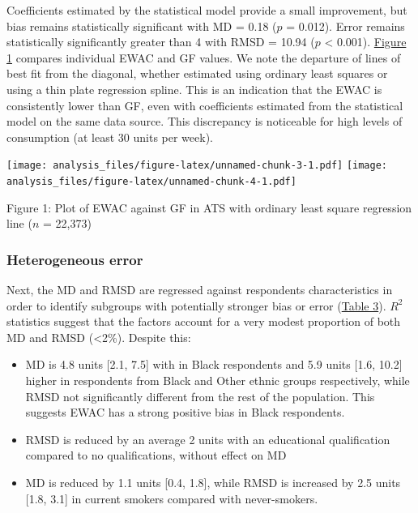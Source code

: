 \documentclass[]{article}
\providecommand{\tightlist}{%
  \setlength{\itemsep}{0pt}\setlength{\parskip}{0pt}}
\begin{document}
Coefficients estimated by the statistical model provide a small
improvement, but bias remains statistically significant with MD = 0.18
(\(p\) = 0.012). Error remains statistically significantly greater than
4 with RMSD = 10.94 (\(p\) \textless{} 0.001).
\protect\hyperlink{figure1}{Figure 1} compares individual EWAC and GF
values. We note the departure of lines of best fit from the diagonal,
whether estimated using ordinary least squares or using a thin plate
regression spline. This is an indication that the EWAC is consistently
lower than GF, even with coefficients estimated from the statistical
model on the same data source. This discrepancy is noticeable for high
levels of consumption (at least 30 units per week).


\texttt{[image: analysis\_files/figure-latex/unnamed-chunk-3-1.pdf]} 
\texttt{[image: analysis\_files/figure-latex/unnamed-chunk-4-1.pdf]}

Figure 1: Plot of EWAC against GF in ATS with ordinary least square
regression line (\(n\) = 22,373)

\hypertarget{heterogeneous-error}{%
\subsubsection{Heterogeneous error}\label{heterogeneous-error}}

Next, the MD and RMSD are regressed against respondents characteristics
in order to identify subgroups with potentially stronger bias or error
(\protect\hyperlink{tab_ewac_validity_reg}{Table 3}). \(R^2\) statistics
suggest that the factors account for a very modest proportion of both MD
and RMSD (\textless{}2\%). Despite this:

\begin{itemize}
\tightlist
\item
  MD is 4.8 units {[}2.1, 7.5{]} with in Black respondents and 5.9 units
  {[}1.6, 10.2{]} higher in respondents from Black and Other ethnic
  groups respectively, while RMSD not significantly different from the
  rest of the population. This suggests EWAC has a strong positive bias
  in Black respondents.
\item
  RMSD is reduced by an average 2 units with an educational
  qualification compared to no qualifications, without effect on MD
\item
  MD is reduced by 1.1 units {[}0.4, 1.8{]}, while RMSD is increased by
  2.5 units {[}1.8, 3.1{]} in current smokers compared with
  never-smokers.
\end{itemize}
\end{document}
